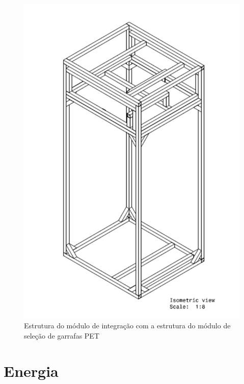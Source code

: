 \begin{anexosenv}
\begin{figure}[!ht]
	\centering
		\includegraphics[scale=0.6]{figuras/estrutura/anexos/20.png}
	\caption{Estrutura do módulo de integração com a estrutura do módulo de seleção de garrafas PET}
\end{figure}

\chapter{Energia}


\end{anexosenv}

